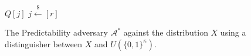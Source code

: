 \begin{figure}[t]
\begin{algorithm}[H]
    \caption{\label{alg.predictability-adversary}
    The Predictability adversary $\mathcal{A}^*$
    against the distribution $X$
    using a distinguisher between $X$ and $U(\{0,1\}^\kappa)$.}
    \begin{algorithmic}[1]
            \State\Return$Q[j]$
        \EndFunction
                \State$j \stackrel{\$}{\gets} [r]$
            \Else
            \EndIf

                \State{}
            \Else
                \State{}
            \EndIf
        \EndFunction
    \end{algorithmic}
\end{algorithm}
\end{figure}
